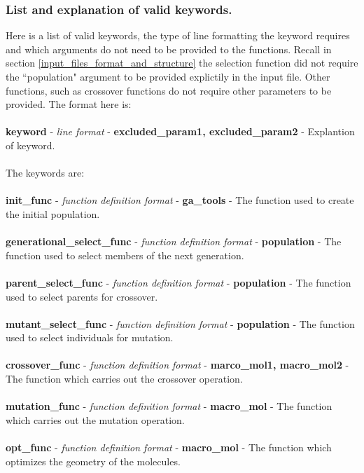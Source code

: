 \documentclass[12pt]{article}
\begin{document}
\subsubsection{List and explanation of valid keywords.}
\label{list and explanation of valid keywords.}
Here is a list of valid keywords, the type of line formatting the keyword requires and which arguments do not need to be provided to the functions. Recall in section \ref{input_files_format_and_structure} the selection function did not require the ``population" argument to be provided explictily in the input file. Other functions, such as crossover functions do not require other parameters to be provided. The format here is:
\\
\\
\textbf{keyword} - \textit{line format} - \textbf{excluded\_param1, excluded\_param2} - Explantion of keyword.
\\
\\
The keywords are:
\\
\\
\textbf{init\_func} - \textit{function definition format} - \textbf{ga\_tools} - The function used to create the initial population.
\\
\\
\textbf{generational\_select\_func} - \textit{function definition format} - \textbf{population} - The function used to select members of the next generation.
\\
\\
\textbf{parent\_select\_func} - \textit{function definition format} - \textbf{population} - The function used to select parents for crossover.
\\
\\
\textbf{mutant\_select\_func} - \textit{function definition format} - \textbf{population} - The function used to select individuals for mutation.
\\
\\
\textbf{crossover\_func} - \textit{function definition format} - \textbf{marco\_mol1, macro\_mol2} - The function which carries out the crossover operation.
\\
\\
\textbf{mutation\_func} - \textit{function definition format} - \textbf{macro\_mol} - The function which carries out the mutation operation.
\\
\\
\textbf{opt\_func} - \textit{function definition format} - \textbf{macro\_mol} - The function which optimizes the geometry of the molecules.
\end{document}
